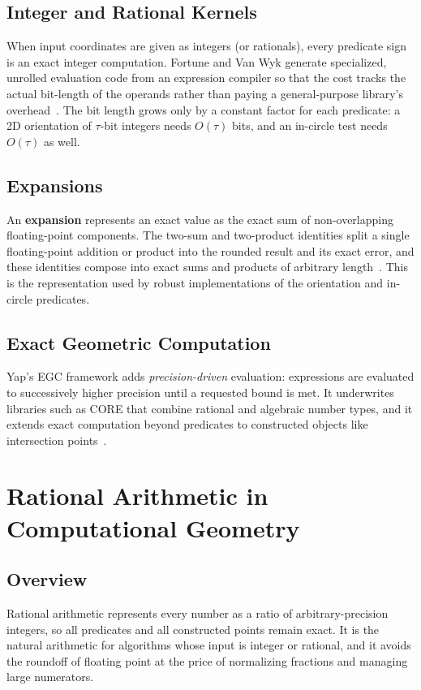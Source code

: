 \subsection{Integer and Rational Kernels}
When input coordinates are given as integers (or rationals), every predicate
sign is an exact integer computation. Fortune and Van Wyk generate
specialized, unrolled evaluation code from an expression compiler so that the
cost tracks the actual bit-length of the operands rather than paying a
general-purpose library's overhead~\cite{fortune1993,fortune1996}. The bit
length grows only by a constant factor for each predicate: a 2D
orientation of $\tau$-bit integers needs $O(\tau)$ bits, and an in-circle
test needs $O(\tau)$ as well.

\subsection{Expansions}
An \textbf{expansion} represents an exact value as the
exact sum of non-overlapping floating-point components. The two-sum and
two-product identities split a single floating-point addition or product into
the rounded result and its exact error, and these identities compose into
exact sums and products of arbitrary length~\cite{priest1991,shewchuk1997}.
This is the representation used by robust implementations of the orientation
and in-circle predicates.

\subsection{Exact Geometric Computation}
Yap's EGC framework adds \emph{precision-driven} evaluation: expressions are
evaluated to successively higher precision until a requested bound is met.
It underwrites libraries such as CORE that combine rational and algebraic
number types, and it extends exact computation beyond predicates to
constructed objects like intersection points~\cite{yap1997,halperin2004}.

\section{Rational Arithmetic in Computational Geometry}
\label{sec:rational_arithmetic}

\subsection{Overview}
Rational arithmetic represents every number as a
ratio of arbitrary-precision integers, so all predicates and all constructed
points remain exact. It is the natural arithmetic for algorithms whose input
is integer or rational, and it avoids the roundoff of floating point at the
price of normalizing fractions and managing large numerators.

